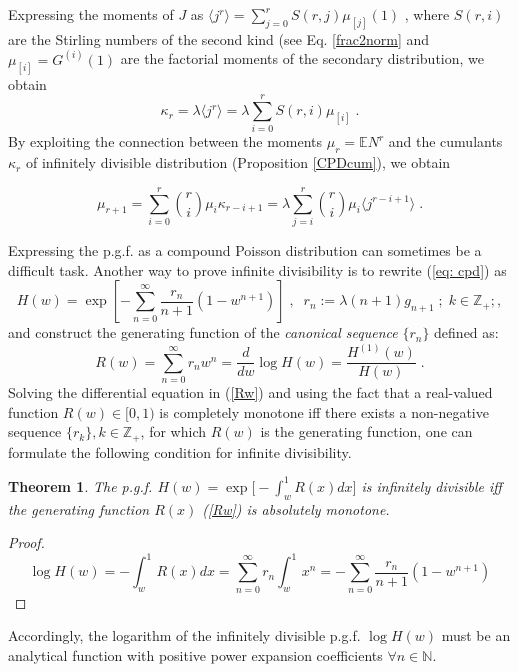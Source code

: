\documentclass[a4paper,12pt]{amsart}
\newcommand{\E}{\mathbb{E}}
\newcommand{\N}{\mathbb{N}}
\newcommand{\Z}{\mathbb{Z}_{+}}
\newtheorem{Theorem}{Theorem}[section]
\theoremstyle{definition}
\theoremstyle{remark}
\begin{document}
Expressing the moments of $J$ as $\langle j^r \rangle = \sum_{j=0}^r S(r,j)\mu_{[j]}(1)$ \cite{JKK2005}, where $S(r, i)$ are the Stirling numbers of the second kind  (see Eq. \ref{frac2norm} and $\mu_{[i]} = G^{(i)}(1)$ are the factorial moments of the secondary distribution, we obtain
\begin{equation}\label{cum2fac}
\kappa_r= \lambda \langle j^r \rangle = \lambda \sum_{i=0}^r S(r,i)\mu_{[i]}\;.    
\end{equation}
By exploiting the connection between the moments $\mu_r=\E N^r$ and the cumulants $\kappa_r$ of infinitely divisible distribution (Proposition \ref{CPDcum}), we obtain 

\begin{equation}\label{mom2cum}
 \mu_{r+1}=\sum_{i=0}^r \binom{r}{i}\mu_i\kappa_{r-i+1} =\lambda\sum_{j=i}^r \binom{r}{i}\mu_i \langle j^{r-i+1} \rangle\;.
\end{equation}   

Expressing the p.g.f. as a compound Poisson distribution can sometimes be a difficult task. Another way to prove infinite divisibility is  to rewrite (\ref{eq: cpd}) as 
\begin{equation}
\label{eq: cpdr}
H(w)=\exp\left[-\sum_{n=0}^{\infty}\frac{r_n}{n+1}(1-w^{n+1}) \right]\;,\;\; r_n:=\lambda(n+1)g_{n+1}\;;\; k\in\Z;,
\end{equation}
and construct the generating function of the {\it canonical sequence}   $\{r_n\}$ defined as:  
\begin{equation}\label{Rw}
 R(w)\!=\! \sum_{n=0}^{\infty}r_n w^n \!=\!\frac{d}{dw}\log H(w)\!=\!\frac{H^{(1)}(w)}{H(w)}\;.
\end{equation}
Solving the differential equation in (\ref{Rw})  and using the fact that a real-valued function $R(w) \in [ 0,1)$ is completely monotone iff there exists a non-negative sequence $\{r_k\}, k \in \Z$, for which $R(w)$ is the generating function, one can formulate the following condition for infinite divisibility.

\begin{Theorem}{\rm \cite{StvH2004}}\label{HexpR}
The p.g.f. $H(w)\!=\! \exp \Big [\! - \! \int_w^1 R(x) dx  \Big ]$ is infinitely divisible iff the generating function $R(x)$ (\ref{Rw}) is absolutely monotone. 
\end{Theorem}
\begin{proof}
\[
\log H(w)=-\int_w^1 R(x) dx =\sum_{n=0}^{\infty}r_n \int_w^1 x^n= -\sum_{n=0}^{\infty}\frac{r_n}{n+1}(1-w^{n+1})
\]
\end{proof}
Accordingly, the logarithm of the infinitely divisible p.g.f. $\log H(w)$  must be an analytical function with positive power expansion coefficients  $\forall n \in \N$.
\end{document}
